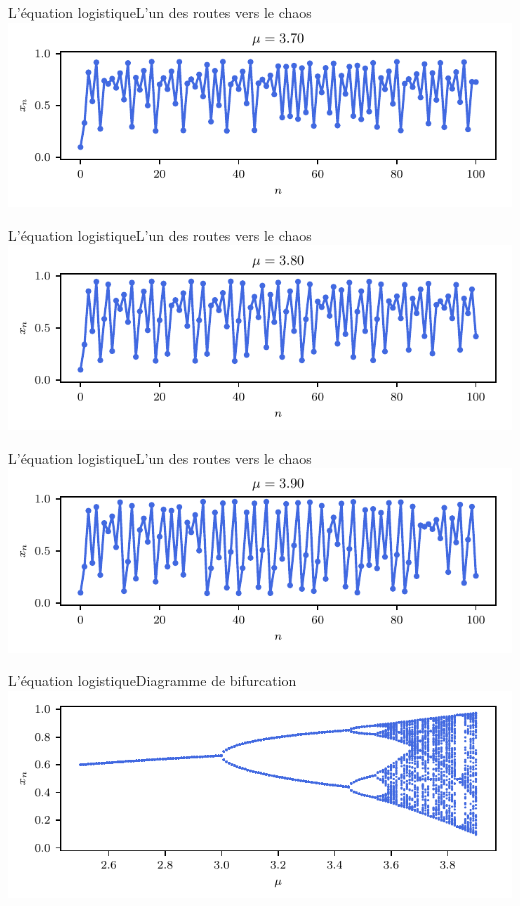 \documentclass[usenames,dvipsnames,svgnames,10pt,aspectratio=169]{beamer}
\begin{document}
\begin{frame}[t, c]{L'équation logistique}{L'un des routes vers le chaos}
	\centering
	\includegraphics[width=.75\textwidth]{logistic_map_9}
\end{frame}

\begin{frame}[t, c]{L'équation logistique}{L'un des routes vers le chaos}
	\centering
	\includegraphics[width=.75\textwidth]{logistic_map_10}
\end{frame}

\begin{frame}[t, c]{L'équation logistique}{L'un des routes vers le chaos}
	\centering
	\includegraphics[width=.75\textwidth]{logistic_map_11}
\end{frame}

\begin{frame}[t, c]{L'équation logistique}{Diagramme de bifurcation}
	\centering
	\includegraphics[width=.75\textwidth]{logistic_map_bifurcation}
\end{frame}
\end{document}
